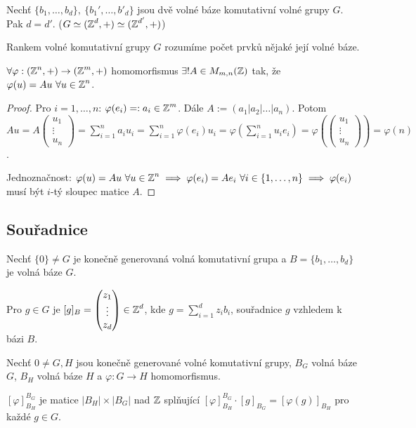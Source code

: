 \begin{consequence}
Nechť $\{b_1, \dots, b_d\}, \ \{b_1', \dots, b'_d\}$ jsou dvě volné báze komutativní volné grupy $G$. Pak $d = d'$. ($G \simeq (\operatorname{\mathbb{Z}}^d, +) \simeq (\operatorname{\mathbb{Z}}^{d'}, +)$)
\end{consequence}

\begin{definition}
Rankem volné komutativní grupy $G$ rozumíme počet prvků nějaké její volné báze.
\end{definition}

\begin{claim}
$\forall\varphi: (\operatorname{\mathbb{Z}}^n, +) \rightarrow (\operatorname{\mathbb{Z}}^m, +)$ homomorfismus $\exists ! A\in M_{m,n}(\operatorname{\mathbb{Z}})$ tak, že $\varphi(u)=Au \ \forall u\in\operatorname{\mathbb{Z}}^n$.
\end{claim}

\begin{proof}
Pro $i = 1, \dots , n$: $\varphi(e_i) =: a_i \in \operatorname{\mathbb{Z}}^m$. Dále $A:= (a_1|a_2|\dots|a_n)$. Potom $Au = A \begin{pmatrix}
u_1 \\
\vdots \\
u_n
\end{pmatrix}
=\sum_{i=1}^n a_iu_i =\sum_{i=1}^n \varphi(e_i)u_i 
= \varphi(\sum_{i=1}^nu_ie_i) = \varphi(\begin{pmatrix}
u_1 \\
\vdots \\
u_n
\end{pmatrix}) = \varphi(n)$.

Jednoznačnost: $\varphi(u)=Au \ \forall u\in\operatorname{\mathbb{Z}}^n\implies \varphi(e_i)=A e_i \ \forall i \in \{1,\dots,n\}\implies \varphi(e_i)$ musí být $i$-tý sloupec matice $A$. 
\end{proof}

\subsection{Souřadnice}
Nechť $\{0\}\neq G$ je konečně generovaná volná komutativní grupa a $B = \{b_1, \dots, b_d\}$ je volná báze $G$.

Pro $g \in G$ je $[g]_B = \begin{pmatrix}
z_1 \\
\vdots \\
z_d
\end{pmatrix} \in \operatorname{\mathbb{Z}}^d$, kde $g = \sum_{i = 1}^d z_ib_i$, souřadnice $g$ vzhledem k bázi $B$.

\begin{definition}
Nechť $0 \neq G,H$ jsou konečně generované volné komutativní grupy, $B_G$ volná báze $G$, $B_H$ volná báze $H$ a $\varphi: G \rightarrow H$ homomorfismus.

$[\varphi]_{B_H}^{B_G}$ je matice $|B_H| \times |B_G|$ nad $\operatorname{\mathbb{Z}}$ 
splňující $[\varphi]_{B_H}^{B_G}\cdot[g]_{B_G}=[\varphi(g)]_{B_H}$ pro každé $g\in G$.
\end{definition}

